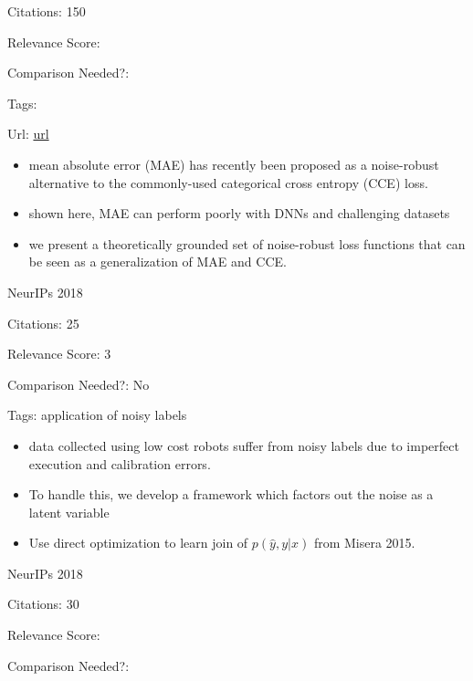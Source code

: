 \documentclass[11pt]{article}
\begin{document}
\noindent Citations: 150

\noindent Relevance Score:

\noindent Comparison Needed?: 

\noindent Tags:

\noindent Url: \href{https://papers.nips.cc/paper/8094-generalized-cross-entropy-loss-for-training-deep-neural-networks-with-noisy-labels.pdf}{url}

\begin{itemize}
\item mean absolute error (MAE) has recently been proposed as a noise-robust alternative to the commonly-used categorical cross entropy (CCE) loss.
\item shown here, MAE can perform poorly with DNNs and challenging datasets
\item we present a theoretically grounded set of noise-robust loss functions that can be seen as a generalization of MAE and CCE.
\end{itemize}

\vspace{2cm}

\noindent NeurIPs 2018

\noindent Citations: 25

\noindent Relevance Score: 3

\noindent Comparison Needed?: No

\noindent Tags: application of noisy labels

\begin{itemize}
\item data collected using low cost robots suffer from noisy labels due to imperfect execution and calibration errors.
\item To handle this, we develop a framework which factors out the noise as a latent variable
\item Use direct optimization to learn join of $p(\hat{y},y|x)$ from Misera 2015.
\end{itemize}

\vspace{2cm}

\noindent NeurIPs 2018

\noindent Citations: 30

\noindent Relevance Score:

\noindent Comparison Needed?: 
\end{document}
